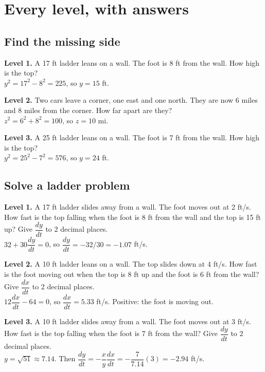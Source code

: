 \documentclass[11pt]{article}
\begin{document}
\section*{Every level, with answers}
\subsection*{Find the missing side}
\noindent\textbf{Level 1.} A 17 ft ladder leans on a wall. The foot is 8 ft from the wall. How high is the top?\\  \quad $y^2=17^2-8^2=225$, so $y=15$ ft.\par\medskip
\noindent\textbf{Level 2.} Two cars leave a corner, one east and one north. They are now 6 miles and 8 miles from the corner. How far apart are they?\\  \quad $z^2=6^2+8^2=100$, so $z=10$ mi.\par\medskip
\noindent\textbf{Level 3.} A 25 ft ladder leans on a wall. The foot is 7 ft from the wall. How high is the top?\\  \quad $y^2=25^2-7^2=576$, so $y=24$ ft.\par\medskip
\subsection*{Solve a ladder problem}
\noindent\textbf{Level 1.} A 17 ft ladder slides away from a wall. The foot moves out at 2 ft/s. How fast is the top falling when the foot is 8 ft from the wall and the top is 15 ft up? Give $\dfrac{dy}{dt}$ to 2 decimal places.\\  \quad $32+30\dfrac{dy}{dt}=0$, so $\dfrac{dy}{dt}=-32/30=-1.07$ ft/s.\par\medskip
\noindent\textbf{Level 2.} A 10 ft ladder leans on a wall. The top slides down at 4 ft/s. How fast is the foot moving out when the top is 8 ft up and the foot is 6 ft from the wall? Give $\dfrac{dx}{dt}$ to 2 decimal places.\\  \quad $12\dfrac{dx}{dt}-64=0$, so $\dfrac{dx}{dt}=5.33$ ft/s. Positive: the foot is moving out.\par\medskip
\noindent\textbf{Level 3.} A 10 ft ladder slides away from a wall. The foot moves out at 3 ft/s. How fast is the top falling when the foot is 7 ft from the wall? Give $\dfrac{dy}{dt}$ to 2 decimal places.\\  \quad $y=\sqrt{51}\approx7.14$. Then $\dfrac{dy}{dt}=-\dfrac{x}{y}\dfrac{dx}{dt}=-\dfrac{7}{7.14}(3)=-2.94$ ft/s.\par\medskip
\end{document}
